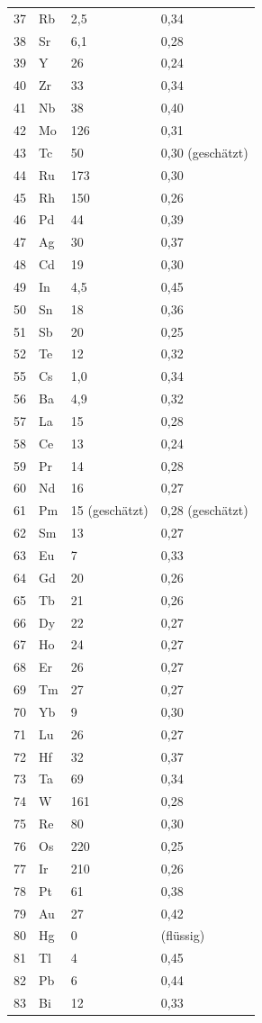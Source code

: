 \documentclass[12pt,a4paper]{article}
\begin{document}
\begin{longtable}{p{0.6cm}p{1.2cm}p{1.5cm}p{1.5cm}}
		37 & Rb & 2,5 & 0,34 \\
		38 & Sr & 6,1 & 0,28 \\
		39 & Y  & 26 & 0,24 \\
		40 & Zr & 33 & 0,34 \\
		41 & Nb & 38 & 0,40 \\
		42 & Mo & 126 & 0,31 \\
		43 & Tc & 50 & 0,30 (geschätzt) \\
		44 & Ru & 173 & 0,30 \\
		45 & Rh & 150 & 0,26 \\
		46 & Pd & 44 & 0,39 \\
		47 & Ag & 30 & 0,37 \\
		48 & Cd & 19 & 0,30 \\
		49 & In & 4,5 & 0,45 \\
		50 & Sn & 18 & 0,36 \\
		51 & Sb & 20 & 0,25 \\
		52 & Te & 12 & 0,32 \\
		55 & Cs & 1,0 & 0,34 \\
		56 & Ba & 4,9 & 0,32 \\
		57 & La & 15 & 0,28 \\
		58 & Ce & 13 & 0,24 \\
		59 & Pr & 14 & 0,28 \\
		60 & Nd & 16 & 0,27 \\
		61 & Pm & 15 (geschätzt) & 0,28 (geschätzt) \\
		62 & Sm & 13 & 0,27 \\
		63 & Eu & 7 & 0,33 \\
		64 & Gd & 20 & 0,26 \\
		65 & Tb & 21 & 0,26 \\
		66 & Dy & 22 & 0,27 \\
		67 & Ho & 24 & 0,27 \\
		68 & Er & 26 & 0,27 \\
		69 & Tm & 27 & 0,27 \\
		70 & Yb & 9 & 0,30 \\
		71 & Lu & 26 & 0,27 \\
		72 & Hf & 32 & 0,37 \\
		73 & Ta & 69 & 0,34 \\
		74 & W  & 161 & 0,28 \\
		75 & Re & 80 & 0,30 \\
		76 & Os & 220 & 0,25 \\
		77 & Ir & 210 & 0,26 \\
		78 & Pt & 61 & 0,38 \\
		79 & Au & 27 & 0,42 \\
		80 & Hg & 0 & (flüssig) \\
		81 & Tl & 4 & 0,45 \\
		82 & Pb & 6 & 0,44 \\
		83 & Bi & 12 & 0,33 \\
		\bottomrule
	\end{longtable}
	
\end{document}
